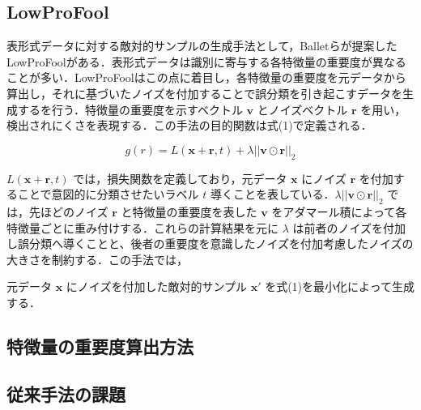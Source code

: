 

\subsection{LowProFool}
表形式データに対する敵対的サンプルの生成手法として，Balletらが提案したLowProFool\cite{ballet2019imperceptible}がある．表形式データは識別に寄与する各特徴量の重要度が異なることが多い．LowProFoolはこの点に着目し，各特徴量の重要度を元データから算出し，それに基づいたノイズを付加することで誤分類を引き起こすデータを生成するを行う．特徴量の重要度を示すベクトル $\bm{v}$ とノイズベクトル $\bm{r}$ を用い，検出されにくさを表現する．この手法の目的関数は式(1)で定義される．

\begin{equation}
g(r) = L(\bm{x}+\bm{r}, t) + \lambda ||\bm{v} \odot \bm{r}||_2 \tag{2}
\end{equation}

 $L(\bm{x}+\bm{r}, t)$ では，損失関数を定義しており，元データ $\bm{x}$ にノイズ $\bm{r}$ を付加することで意図的に分類させたいラベル $t$ 導くことを表している．$\lambda ||\bm{v} \odot \bm{r}||_2$ では，先ほどのノイズ $\bm{r}$ と特徴量の重要度を表した $\bm{v}$ をアダマール積によって各特徴量ごとに重み付けする．これらの計算結果を元に $\lambda$ は前者のノイズを付加し誤分類へ導くことと、後者の重要度を意識したノイズを付加考慮したノイズの大きさを制約する．この手法では，

元データ $\bm{x}$ にノイズを付加した敵対的サンプル $\bm{x}'$ を式(1)を最小化によって生成する．

\subsection{特徴量の重要度算出方法}

\subsection{従来手法の課題}